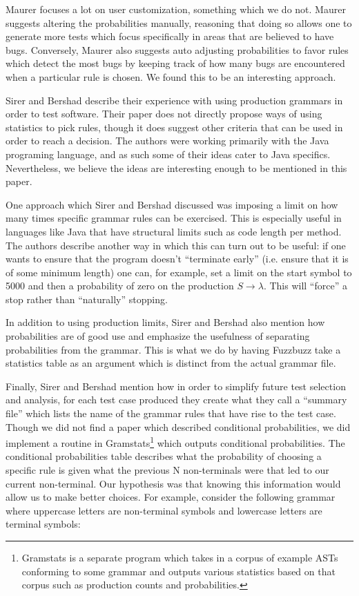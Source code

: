 Maurer focuses a lot on user customization, something which we do not. Maurer
suggests altering the probabilities manually, reasoning that doing so allows
one to generate more tests which focus specifically in areas that are believed
to have bugs. Conversely, Maurer also suggests auto adjusting probabilities to
favor rules which detect the most bugs by keeping track of how many bugs are
encountered when a particular rule is chosen. We found this to be an interesting
approach.

Sirer and Bershad\cite{Bershad1999} describe their experience with using
production grammars in order to test software. Their paper does not directly
propose ways of using statistics to pick rules, though it does suggest other
criteria that can be used in order to reach a decision. The authors were
working primarily with the Java programing language, and as such some of their
ideas cater to Java specifics. Nevertheless, we believe the ideas are
interesting enough to be mentioned in this paper.

One approach which Sirer and Bershad discussed was imposing a limit on how many
times specific grammar rules can be exercised. This is especially useful in
languages like Java that have structural limits such as code length per
method. The authors describe another way in which this can turn out to be
useful: if one wants to ensure that the program doesn't ``terminate early''
(i.e. ensure that it is of some minimum length) one can, for example, set a
limit on the start symbol to 5000 and then a probability of zero on the
production $S \rightarrow \lambda$. This will ``force'' a stop rather than
``naturally'' stopping.

In addition to using production limits, Sirer and Bershad also mention how
probabilities are of good use and emphasize the usefulness of separating
probabilities from the grammar. This is what we do by having Fuzzbuzz take a
statistics table as an argument which is distinct from the actual grammar file.

Finally, Sirer and Bershad mention how in order to simplify future test
selection and analysis, for each test case produced they create what they call
a ``summary file'' which lists the name of the grammar rules that have rise to
the test case. \\

Though we did not find a paper which described conditional probabilities, we
did implement a routine in Gramstats\footnote{Gramstats is a separate program
which takes in a corpus of example ASTs conforming to some grammar and outputs
various statistics based on that corpus such as production counts and
probabilities.} which outputs conditional probabilities. The conditional
probabilities table describes what the probability of choosing a specific rule
is given what the previous N non-terminals were that led to our current
non-terminal. Our hypothesis was that knowing this information would allow us
to make better choices. For example, consider the following grammar where
uppercase letters are non-terminal symbols and lowercase letters are
terminal symbols:

